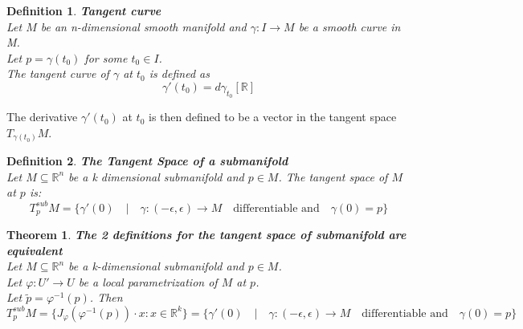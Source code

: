 \documentclass[11pt]{book} %
\newtheorem{theorem}{Theorem}[section]
\newtheorem{definition}{Definition}[section]
\begin{document}
\begin{definition}{\textbf{Tangent curve}} \\
    Let \( M \) be an n-dimensional smooth manifold and \( \gamma: I \to M \) be a smooth curve in M. \\
    Let \( p = \gamma(t_0) \) for some \( t_0 \in I \). \\
    The tangent curve of \( \gamma \) at \( t_0 \) is defined as 
    \begin{equation*}
        \gamma'(t_0) = d\gamma_{t_0}[\mathbb{R}]
    \end{equation*}
\end{definition}

The derivative \( \gamma'(t_0) \) at \( t_0 \) is then defined to be a vector in the tangent space \( T_{\gamma(t_0)}M \).


\begin{definition}{\textbf{The Tangent Space of a submanifold}} \\
    Let \( M \subseteq \mathbb{R}^n \) be a k dimensional submanifold and \( p \in M \). 
    The tangent space of \( M \) at \( p \) is:
    \begin{equation*}
        T_p^{sub}M = \{ \gamma'(0) \quad | \quad \gamma : (-\epsilon, \epsilon) \to M \quad \text{differentiable and} \quad \gamma(0) = p \}        
    \end{equation*}
\end{definition}


\begin{theorem}{\textbf{The 2 definitions for the tangent space of submanifold are equivalent}} \\
    Let \( M \subseteq \mathbb{R}^n \) be a k-dimensional submanifold and \( p \in M \). \\
    Let \( \varphi : U' \to U \) be a local parametrization of \( M \) at \( p \). \\
    Let \( \tilde{p} = \varphi^{-1}(p) \). Then 
    \begin{equation*}
        T_p^{sub}M = \{ J_{\varphi}(\varphi^{-1}(p)) \cdot x : x \in \mathbb{R}^k \} = 
        \{ \gamma'(0) \quad | \quad \gamma : (-\epsilon, \epsilon) \to M \quad \text{differentiable and} \quad \gamma(0) = p \}
    \end{equation*}    
\end{theorem}
\end{document}
